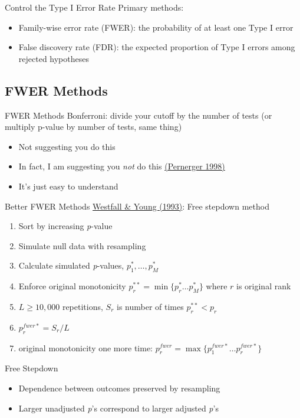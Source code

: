 \documentclass{beamer}
\begin{document}
\begin{frame}{Control the Type I Error Rate}
Primary methods:
\begin{itemize}
\item Family-wise error rate (FWER): the probability of at least one Type I error
\item False discovery rate (FDR): the expected proportion of Type I errors among rejected hypotheses
\end{itemize}
\end{frame}

\subsection{FWER Methods}
\begin{frame}{FWER Methods}
Bonferroni: divide your cutoff by the number of tests (or multiply p-value by number of tests, same thing)
\begin{itemize}
\item Not suggesting you do this
\item In fact, I am suggesting you \textit{not} do this 
\href{https://www.ncbi.nlm.nih.gov/pmc/articles/PMC1112991/}{(Pernerger 1998)}
\item It's just easy to understand
\end{itemize}
\end{frame}

\begin{frame}{Better FWER Methods}
\href{http://www.jstor.org/stable/2532216}{Westfall \& Young (1993)}: Free stepdown method
\begin{enumerate}
\item Sort by increasing \textit{p}-value
\item Simulate null data with resampling
\item Calculate simulated \textit{p}-values, $p^*_1, \ldots ,p^*_M$
\item Enforce original monotonicity $p^{**}_r=\min \{p^*_r \ldots p^*_M\}$ where $r$ is original rank
\item $L \geq 10,000$ repetitions, $S_r$ is number of times $p^{**}_r  < p_r$
\item $p_r^{fwer*}=S_r/L$
\item original monotonicity one more time: $p_r^{fwer}=\max \{p_1^{fwer*} \ldots p_r^{fwer*} \}$
\end{enumerate}
\end{frame}

\begin{frame}[label=FWERmain]{Free Stepdown}
\begin{itemize}
\item Dependence between outcomes preserved by resampling
\item Larger unadjusted \textit{p}'s correspond to larger adjusted \textit{p}'s
\end{itemize}
\hyperlink{FWERex}{}

\end{frame}
\end{document}
